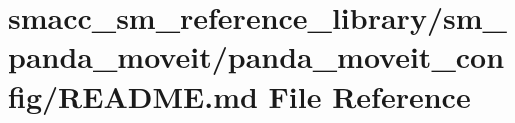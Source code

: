 \hypertarget{smacc__sm__reference__library_2sm__panda__moveit_2panda__moveit__config_2README_8md}{}\section{smacc\+\_\+sm\+\_\+reference\+\_\+library/sm\+\_\+panda\+\_\+moveit/panda\+\_\+moveit\+\_\+config/\+R\+E\+A\+D\+ME.md File Reference}
\label{smacc__sm__reference__library_2sm__panda__moveit_2panda__moveit__config_2README_8md}
